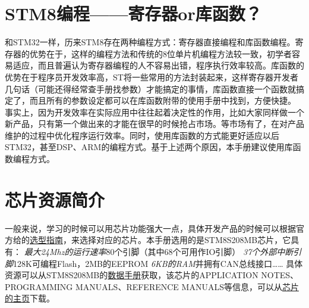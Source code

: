 \documentclass[a4paper]{book}
\begin{document}
\section{STM8编程------寄存器or库函数？}

和STM32一样，历来STM8存在两种编程方式：寄存器直接编程和库函数编程。寄存器的优势在于，这样的编程方法和传统的8位单片机编程方法较一致，初学者容易适应，而且普遍认为寄存器编程的人不容易出错，程序执行效率较高。库函数的优势在于程序员开发效率高，ST将一些常用的方法封装起来，这样寄存器开发者几句话（可能还得经常查手册找参数）才能搞定的事情，库函数直接一个函数就搞定了，而且所有的参数设定都可以在库函数附带的使用手册中找到，方便快捷。 事实上，因为开发效率在实际应用中往往起着决定性的作用，比如大家同样做一个新产品，只有第一个做出来的才能在很早的时候抢占市场。等市场有了，在对产品维护的过程中优化程序运行效率。同时，使用库函数的方式能更好适应以后STM32，甚至DSP、ARM的编程方式。基于上述两个原因，本手册建议使用库函数编程方式。

\section{芯片资源简介}

一般来说，学习的时候可以用芯片功能强大一点，具体开发产品的时候可以根据官方给的\href{http://www.st.com/internet/com/SALES\_AND\_MARKETING\_RESOURCES/MARKETING\_COMMUNICATION/MARKETING\_BROCHURE/brstm8.pdf}{选型指南}，来选择对应的芯片。本手册选用的是STM8S208MB芯片，它具有： \emph{最大24Mhz的运行速率}80个引脚（其中68个可用作IO引脚） \emph{37个外部中断引脚}128K可编程Flash，2MB的EEPROM \emph{6KB的RAM}并拥有CAN总线接口\ldots{}\ldots{} 具体资源可以从STM8S208MB的\href{http://www.st.com/internet/com/TECHNICAL\_RESOURCES/TECHNICAL\_LITERATURE/DATASHEET/CD00197787.pdf}{数据手册}获取，该芯片的APPLICATION NOTES、PROGRAMMING MANUALS、REFERENCE MANUALS等信息，可以从\href{http://www.st.com/internet/mcu/product/190232.jsp}{芯片的主页}下载。
\end{document}
